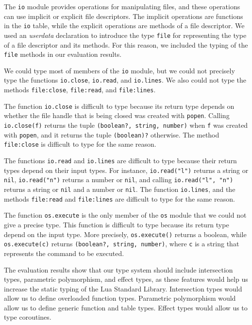 The \texttt{io} module provides operations for manipulating files,
and these operations can use implicit or explicit file descriptors.
The implicit operations are functions in the \texttt{io} table,
while the explicit operations are methods of a file descriptor.
We used an \emph{userdata} declaration to introduce the type
\texttt{file} for representing the type of a file descriptor
and its methods.
For this reason, we included the typing of the \texttt{file}
methods in our evaluation results.

We could type most of members of the \texttt{io} module,
but we could not precisely type the functions \texttt{io.close},
\texttt{io.read}, and \texttt{io.lines}.
We also could not type the methods \texttt{file:close},
\texttt{file:read}, and \texttt{file:lines}.

The function \texttt{io.close} is difficult to type
because its return type depends on whether the file handle that is
being closed was created with \texttt{popen}.
Calling \texttt{io.close(f)} returns the tuple \texttt{(boolean?, string, number)}
when \texttt{f} was created with \texttt{popen},
and it returns the tuple \texttt{(boolean)?} otherwise.
The method \texttt{file:close} is difficult to type for the same reason.

The functions \texttt{io.read} and \texttt{io.lines} are difficult
to type because their return types depend on their input types.
For instance, \texttt{io.read("l")} returns a string or \texttt{nil},
\texttt{io.read("n")} returns a number or \texttt{nil}, and calling
\texttt{io.read("l", "n")} returns a string or \texttt{nil} and a number or \texttt{nil}.
The function \texttt{io.lines}, and the methods \texttt{file:read} and
\texttt{file:lines} are difficult to type for the same reason.

The function \texttt{os.execute} is the only member of the \texttt{os}
module that we could not give a precise type.
This function is difficult to type because its return type depend on
the input type.
More precisely, \texttt{os.execute()} returns a boolean, while
\texttt{os.execute(c)} returns \texttt{(boolean?, string, number)},
where \texttt{c} is a string that represents the command to be executed.

The evaluation results show that our type system should include
intersection types, parametric polymorphism, and effect types,
as these features would help us increase the static typing of the
Lua Standard Library.
Intersection types would allow us to define overloaded function types.
Parametric polymorphism would allow us to define generic function and table types.
Effect types would allow us to type coroutines.

